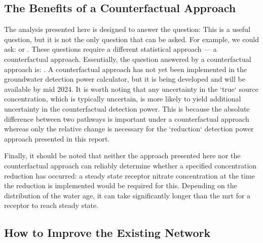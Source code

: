 \subsection[Counterfactual Approach]{The Benefits of a Counterfactual Approach} \label{sec:counterfactual}

The analysis presented here is designed to answer the question:  This is a useful question, but it is not the only question that can be asked.
For example, we could ask:  or .
These questions require a different statistical approach --- a counterfactual approach.
Essentially, the question answered by a counterfactual approach is: .
A counterfactual approach has not yet been implemented in the groundwater detection power calculator\citep{dumont_komanawagw_detect_power_2023}, but it is being developed and will be available by mid 2024.
It is worth noting that any uncertainty in the `true` source concentration, which is typically uncertain, is more likely to yield additional uncertainty in the counterfactual detection power.
This is because the absolute difference between two pathways is important under a counterfactual approach whereas only the relative change is necessary for the `reduction` detection power approach presented in this report.

Finally, it should be noted that neither the approach presented here nor the counterfactual approach can reliably determine whether a specified concentration reduction has occurred: a steady state receptor nitrate concentration at the time the reduction is implemented would be required for this. Depending on the distribution of the water age, it can take significantly longer than the \gls{mrt} for a receptor to reach steady state.

\subsection[Possible Network Improvements]{How to Improve the Existing Network}

